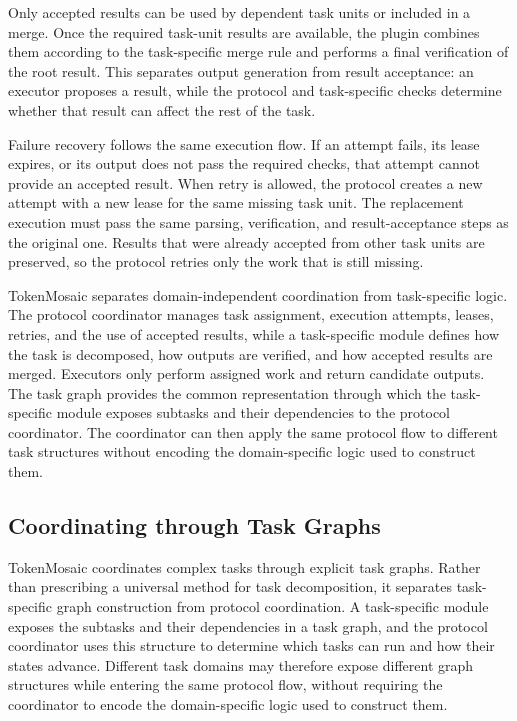 \documentclass{article}
\theoremstyle{plain}
\begin{document}
Only accepted results can be used by dependent task units or included in a merge. Once the required task-unit results are available, the plugin combines them according to the task-specific merge rule and performs a final verification of the root result. This separates output generation from result acceptance: an executor proposes a result, while the protocol and task-specific checks determine whether that result can affect the rest of the task.

Failure recovery follows the same execution flow. If an attempt fails, its lease expires, or its output does not pass the required checks, that attempt cannot provide an accepted result. When retry is allowed, the protocol creates a new attempt with a new lease for the same missing task unit. The replacement execution must pass the same parsing, verification, and result-acceptance steps as the original one. Results that were already accepted from other task units are preserved, so the protocol retries only the work that is still missing.

TokenMosaic separates domain-independent coordination from task-specific logic. The protocol coordinator manages task assignment, execution attempts, leases, retries, and the use of accepted results, while a task-specific module defines how the task is decomposed, how outputs are verified, and how accepted results are merged. Executors only perform assigned work and return candidate outputs. The task graph provides the common representation through which the task-specific module exposes subtasks and their dependencies to the protocol coordinator. The coordinator can then apply the same protocol flow to different task structures without encoding the domain-specific logic used to construct them.





\subsection{Coordinating through Task Graphs}
\label{subsec:task-graph-coordination}

TokenMosaic coordinates complex tasks through explicit task graphs. Rather than prescribing a universal method for task decomposition, it separates task-specific graph construction from protocol coordination. A task-specific module exposes the subtasks and their dependencies in a task graph, and the protocol coordinator uses this structure to determine which tasks can run and how their states advance. Different task domains may therefore expose different graph structures while entering the same protocol flow, without requiring the coordinator to encode the domain-specific logic used to construct them.
\end{document}
